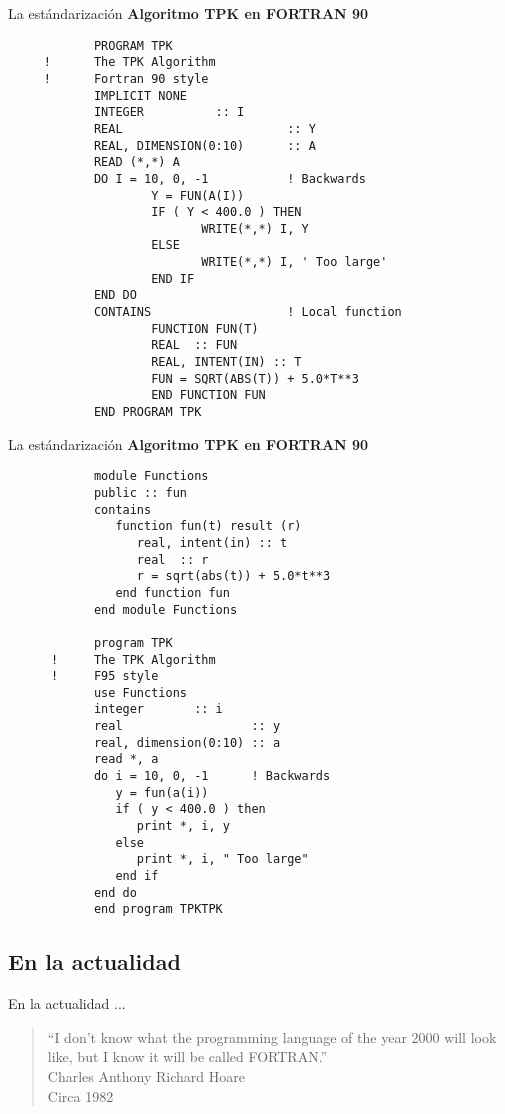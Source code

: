 \begin{frame}[fragile]{La estándarización}
    \textbf{Algoritmo TPK en FORTRAN 90}
    \begin{verbatim}
            PROGRAM TPK
     !      The TPK Algorithm
     !      Fortran 90 style
            IMPLICIT NONE
            INTEGER          :: I
            REAL                       :: Y
            REAL, DIMENSION(0:10)      :: A
            READ (*,*) A
            DO I = 10, 0, -1           ! Backwards
                    Y = FUN(A(I))
                    IF ( Y < 400.0 ) THEN
                           WRITE(*,*) I, Y
                    ELSE
                           WRITE(*,*) I, ' Too large'
                    END IF
            END DO
            CONTAINS                   ! Local function
                    FUNCTION FUN(T)
                    REAL  :: FUN
                    REAL, INTENT(IN) :: T
                    FUN = SQRT(ABS(T)) + 5.0*T**3
                    END FUNCTION FUN
            END PROGRAM TPK
    \end{verbatim}
\end{frame}

\begin{frame}[fragile]{La estándarización}
    \textbf{Algoritmo TPK en FORTRAN 90}
    \begin{verbatim}
            module Functions
            public :: fun
            contains
               function fun(t) result (r)
                  real, intent(in) :: t
                  real  :: r
                  r = sqrt(abs(t)) + 5.0*t**3
               end function fun
            end module Functions

            program TPK
      !     The TPK Algorithm
      !     F95 style
            use Functions
            integer       :: i
            real                  :: y
            real, dimension(0:10) :: a
            read *, a
            do i = 10, 0, -1      ! Backwards
               y = fun(a(i))
               if ( y < 400.0 ) then
                  print *, i, y
               else
                  print *, i, " Too large"
               end if
            end do
            end program TPKTPK
    \end{verbatim}
\end{frame}


\subsection{En la actualidad}
\begin{frame}[fragile]{En la actualidad ...}
  \begin{quote}
    ``I don’t know what the programming language of the year 2000 will look like, but I know it will be called FORTRAN.''\\
    Charles Anthony Richard Hoare\\
    Circa 1982
  \end{quote}
\end{frame}



